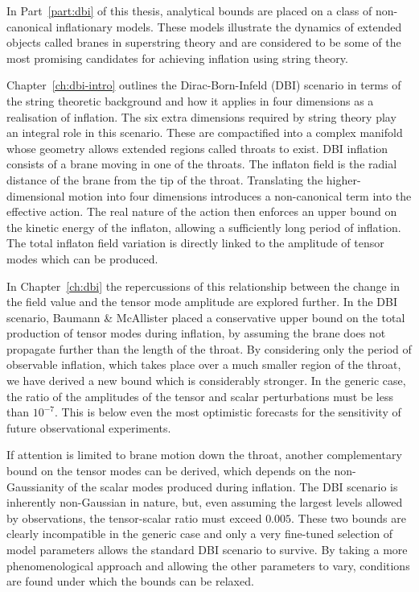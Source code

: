 In Part~\ref{part:dbi} of this thesis, analytical bounds are placed on a class of
non-canonical inflationary models. These models illustrate the dynamics of
extended objects called branes in superstring theory and are considered to be some of
the most promising candidates for achieving inflation using string theory.

Chapter~\ref{ch:dbi-intro} outlines the Dirac-Born-Infeld (DBI) scenario in
terms of the string theoretic background and how it applies in four dimensions
as a realisation of inflation. The six extra dimensions required by string theory
play an integral role in this scenario. These are compactified into a complex
manifold whose geometry allows extended regions called throats to exist. DBI
inflation consists of a brane moving in one of the throats. The inflaton field is
the radial distance of the brane from the tip of the throat. Translating the
higher-dimensional motion into four dimensions introduces a non-canonical term into
the
effective action. The real nature of the action then enforces an upper bound on the
kinetic energy of the inflaton, allowing a sufficiently long period of inflation. The
total inflaton field variation is directly linked to the
amplitude of tensor modes which can be produced.


In Chapter~\ref{ch:dbi} the repercussions of this relationship between the change in
the field value and the tensor mode amplitude are explored further. In the DBI
scenario,
Baumann \& McAllister \cite{bmpaper} placed a conservative
upper bound on the total production of tensor modes during inflation, by assuming the
brane does not propagate further than the length of the throat. By considering only
the
period of observable inflation, which takes place over a much smaller region of the
throat, we have derived a new bound which is considerably stronger. In the
generic
case, the ratio of the amplitudes of the tensor and scalar perturbations must be less
than
$10^{-7}$. This is below  even the most optimistic forecasts for
the sensitivity of future observational experiments. 

If attention is limited to brane motion down the throat, another complementary bound
on the tensor modes can be derived, which depends on the non-Gaussianity of the
scalar modes produced
during inflation. The DBI scenario is inherently non-Gaussian in nature, but, even
assuming the largest levels allowed by observations, the tensor-scalar ratio must
exceed $0.005$. These two bounds are clearly incompatible in the generic
case and only a very fine-tuned selection of model parameters allows the standard DBI
scenario to survive. By taking a more phenomenological approach and allowing the
other parameters to vary,
conditions are found under which the bounds can be relaxed.


